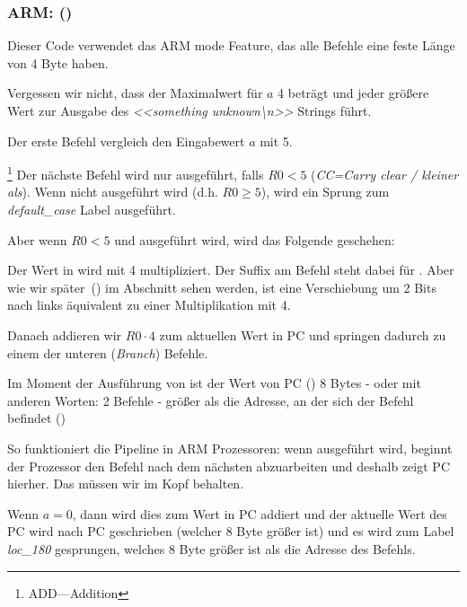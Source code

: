 \subsubsection{ARM: \OptimizingKeilVI (\ARMMode)}
\label{sec:SwitchARMLot}


Dieser Code verwendet das ARM mode Feature, das alle Befehle eine feste Länge von 4 Byte haben.

Vergessen wir nicht, dass der Maximalwert für $a$ 4 beträgt und jeder größere Wert zur Ausgabe des \emph{<<something
unknown\textbackslash{}n>>} Strings führt.

Der erste  Befehl vergleich den Eingabewert $a$ mit 5.

\footnote{ADD---Addition}
Der nächste  Befehl wird nur ausgeführt, falls $R0 < 5$ (\emph{CC=Carry clear / kleiner als}).
Wenn  nicht ausgeführt wird (d.h. $R0\geq 5$), wird ein Sprung zum \emph{default\_case} Label ausgeführt.

Aber wenn $R0 < 5$ und  ausgeführt wird, wird das Folgende geschehen:

Der Wert in  wird mit 4 multipliziert.
Der Suffix  am Befehl steht dabei für .
Aber wie wir später~() im Abschnitt \q{\ShiftsSectionName} sehen werden, ist eine
Verschiebung um 2 Bits nach links äquivalent zu einer Multiplikation mit 4.

Danach addieren wir $R0\cdot 4$ zum aktuellen Wert in \ac{PC} und springen dadurch zu einem der unteren 
(\emph{Branch}) Befehle.

Im Moment der Ausführung von ist der Wert von \ac{PC} () 8 Bytes - oder mit anderen Worten: 2
Befehle - größer als die Adresse, an der sich der  Befehl befindet ()

So funktioniert die Pipeline in ARM Prozessoren: wenn  ausgeführt wird, beginnt der Prozessor den Befehl
nach dem nächsten abzuarbeiten und deshalb zeigt \ac{PC} hierher. Das müssen wir im Kopf behalten.

Wenn $a=0$, dann wird dies zum Wert in \ac{PC} addiert und der aktuelle Wert des \ac{PC} wird nach \ac{PC} geschrieben
(welcher 8 Byte größer ist) und es wird zum Label \emph{loc\_180} gesprungen, welches 8 Byte größer ist als die Adresse
des  Befehls.

